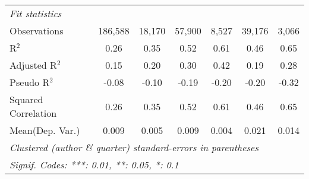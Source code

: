 \begin{tabular}{lcccccc}
   \midrule
   \emph{Fit statistics}\\
   Observations                                               & 186,588       & 18,170   & 57,900   & 8,527          & 39,176      & 3,066\\  
   R$^2$                                                      & 0.26          & 0.35     & 0.52     & 0.61           & 0.46        & 0.65\\  
   Adjusted R$^2$                                             & 0.15          & 0.20     & 0.30     & 0.42           & 0.19        & 0.28\\  
   Pseudo R$^2$                                               & -0.08         & -0.10    & -0.19    & -0.20          & -0.20       & -0.32\\  
   Squared Correlation                                        & 0.26          & 0.35     & 0.52     & 0.61           & 0.46        & 0.65\\  
Mean(Dep. Var.) & 0.009 & 0.005 & 0.009 & 0.004 & 0.021 & 0.014 \\
   \midrule \midrule
   \multicolumn{7}{l}{\emph{Clustered (author \& quarter) standard-errors in parentheses}}\\
   \multicolumn{7}{l}{\emph{Signif. Codes: ***: 0.01, **: 0.05, *: 0.1}}\\
\end{tabular}
\par\endgroup
